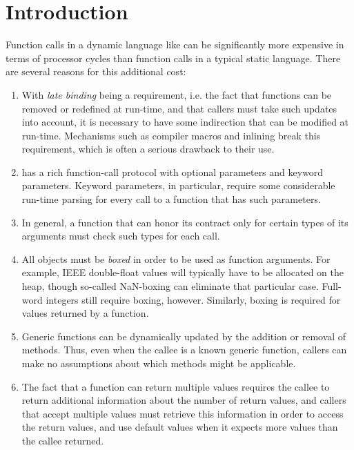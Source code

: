 \section{Introduction}
\label{sec-introduction}

Function calls in a dynamic language like \commonlisp{} can be
significantly more expensive in terms of processor cycles than
function calls in a typical static language.  There are several
reasons for this additional cost:

\begin{enumerate}
\item With \emph{late binding} being a requirement, i.e. the fact that
  functions can be removed or redefined at run-time, and that callers
  must take such updates into account, it is necessary to have some
  indirection that can be modified at run-time.  Mechanisms such as
  compiler macros and inlining break this requirement, which is often
  a serious drawback to their use.
\item \commonlisp{} has a rich function-call protocol with optional
  parameters and keyword parameters.  Keyword parameters, in
  particular, require some considerable run-time parsing for every
  call to a function that has such parameters.
\item In general, a function that can honor its contract only for
  certain types of its arguments must check such types for each call.
\item All objects must be \emph{boxed} in order to be used as function
  arguments.  For example, IEEE double-float values will typically
  have to be allocated on the heap, though so-called NaN-boxing
  \cite{Gudeman93representingtype} can eliminate that particular case.
  Full-word integers still require boxing, however.  Similarly, boxing
  is required for values returned by a function.
\item Generic functions can be dynamically updated by the addition or
  removal of methods.  Thus, even when the callee is a known generic
  function, callers can make no assumptions about which methods might
  be applicable.
\item The fact that a function can return multiple values requires the
  callee to return additional information about the number of
  return values, and callers that accept multiple values must retrieve
  this information in order to access the return values, and use
  default values when it expects more values than the callee
  returned.
\end{enumerate}

